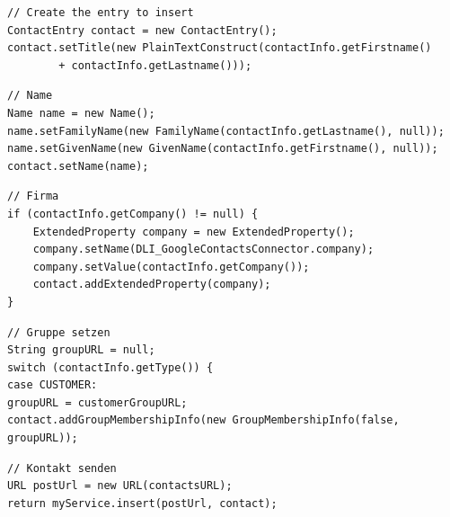 \begin{lstlisting}[float]
// Create the entry to insert
ContactEntry contact = new ContactEntry();
contact.setTitle(new PlainTextConstruct(contactInfo.getFirstname()
		+ contactInfo.getLastname()));
\end{lstlisting}

\begin{lstlisting}[float]
// Name
Name name = new Name();
name.setFamilyName(new FamilyName(contactInfo.getLastname(), null));
name.setGivenName(new GivenName(contactInfo.getFirstname(), null));
contact.setName(name);
\end{lstlisting}

\begin{lstlisting}[float]
// Firma
if (contactInfo.getCompany() != null) {
	ExtendedProperty company = new ExtendedProperty();
	company.setName(DLI_GoogleContactsConnector.company);
	company.setValue(contactInfo.getCompany());
	contact.addExtendedProperty(company);
}
\end{lstlisting}

\begin{lstlisting}[float]
// Gruppe setzen
String groupURL = null;
switch (contactInfo.getType()) {
case CUSTOMER:
groupURL = customerGroupURL;
contact.addGroupMembershipInfo(new GroupMembershipInfo(false, groupURL));
\end{lstlisting}

\begin{lstlisting}[float]
// Kontakt senden		
URL postUrl = new URL(contactsURL);
return myService.insert(postUrl, contact);
\end{lstlisting}
